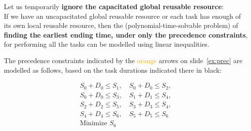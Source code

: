 \documentclass{cons-beamer}
\begin{document}
\begin{frame}%
  Let us temporarily \textbf{ ignore the capacitated global reusable resource}: \\
  If we have an uncapacitated global reusable resource or each task
  has enough of its own local reusable resource, then the
  (polynomial-time-solvable problem) of \textbf{finding the earliest ending
  time, under only the precedence constraints}, for performing all the
  tasks can be modelled using linear inequalities.
  \vfill

  \begin{example}[continued]
    The precedence constraints indicated by the
    \textcolor{Orange}{orange} arrows on slide~\ref{ex:prec} are
    modelled as follows, based on the task durations indicated there
    in black: 

    \begin{align*}
      S_0 + D_0 \leq S_1, \quad S_0 + D_0 \leq S_2, \\ S_0 + D_0 \leq S_3, \quad S_1 + D_1 \leq S_4, \\ S_2 + D_2 \leq S_5, \quad S_3 + D_3 \leq S_4, \\ S_4 + D_4 \leq S_6, \quad S_5 + D_5 \leq S_6 \\
      \text{Minimize } S_6
    \end{align*} 
  \end{example}
\end{frame}
\end{document}
